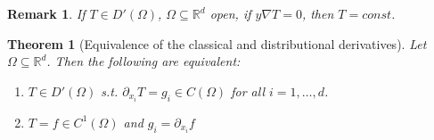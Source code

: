 \documentclass{report}
\theoremstyle{tommy}
\newtheorem{thm}[defn]{Theorem}
\newtheorem{rem}[defn]{Remark}
\begin{document}
  \begin{rem}
    If \(T \in D'(\Omega)\), \(\Omega \subseteq \mathbb{R}^d\) open, if \(y \nabla T = 0\), then \(T = const\).
  \end{rem}

  \begin{thm}[Equivalence of the classical and distributional derivatives]
      Let \(\Omega \subseteq \mathbb{R}^d\). Then the following are equivalent:
      \begin{enumerate}
        \item \(T \in D'(\Omega)\) s.t. \(\partial_{x_i} T = g_i \in C(\Omega)\) for all \(i = 1, \dots, d\).
        \item \(T = f \in C^1(\Omega)\) and \(g_i = \partial_{x_i} f\)
      \end{enumerate}
  \end{thm}
\end{document}
